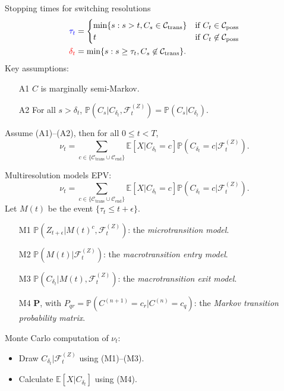 \documentclass[10pt]{beamer}
\newcommand{\prob}{\mathbb{P}}                  %
\newcommand{\E}{\mathbb{E}}											%
\newcommand{\Fz}{\mathcal{F}^{(Z)}}
\newcommand{\Cset}{\mathcal{C}}
\newcommand{\Ctrans}{\mathcal{C}_{\text{trans}}}
\newcommand{\Cend}{\mathcal{C}_{\text{end}}}
\begin{document}
\begin{frame}{Stopping times for switching resolutions}
\begin{align*}
\color{blue}{\tau_t} & = \begin{cases}
\text{min} \{ s : s > t, C_s \in \Cset_{\text{trans}}\} & \text{if } C_t \in \Cset_{\text{poss}} \\
t & \text{if } C_t \not \in \Cset_{\text{poss}}
\end{cases}  \\
\color{red} {\delta_t}  &= \text{min}\{s : s \geq \tau_t, C_s \not \in \Cset_{\text{trans}} \}.
\end{align*}
\pause
Key assumptions:
\begin{itemize}
\item[A1] $C$ is marginally semi-Markov.
\pause
\item[A2] For all $s > \delta_t$, $\prob(C_s | C_{\delta_t}, \Fz_t) = \prob(C_s | C_{\delta_t})$. 
\end{itemize}
\pause
\begin{theorem}
Assume (A1)--(A2), then for all $0 \leq t < T$, 
$$\nu_t = \sum_{c \in \{ \Ctrans \cup \Cend \}} \E[X | C_{\delta_t} = c]\prob(C_{\delta_t} = c | \Fz_t).$$
\end{theorem}
\end{frame}

\begin{frame}{Multiresolution models}
EPV:
$$\nu_t = \sum_{c \in \{ \Ctrans \cup \Cend \}} \E[X | C_{\delta_t} = c]\prob(C_{\delta_t} = c | \Fz_t).$$
\pause
Let $M(t)$ be the event $\{\tau_t \leq t + \epsilon\}$.
\begin{itemize}
\item[M1] $\prob(Z_{t + \epsilon} | M(t)^c, \Fz_t)$: the \emph{microtransition model}.
\item[M2] $\prob(M(t) | \Fz_t)$: the \emph{macrotransition entry model}.
\item[M3] $\prob(C_{\delta_t} | M(t), \Fz_t)$: the \emph{macrotransition exit model}.
\item[M4] $\mathbf{P}$, with  $P_{qr} = \prob(C^{(n+1)} = c_r | C^{(n)} = c_q)$: the \emph{Markov transition probability matrix}.
\end{itemize}
\pause
Monte Carlo computation of $\nu_t$:
\begin{itemize}
\item Draw $C_{\delta_t} | \Fz_t$ using (M1)--(M3).
\item Calculate $\E[X | C_{\delta_t}]$ using (M4).
\end{itemize}
\end{frame}
\end{document}
